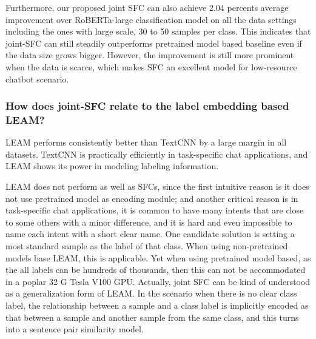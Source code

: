 Furthermore, our proposed joint SFC can also achieve 2.04 percents average
improvement over RoBERTa-large classification model on all the data settings
including the ones with large scale, 30 to 50 samples per class. This
indicates that joint-SFC can still steadily outperforms pretrained model based
baseline even if the data size grows bigger. However, the improvement is still
more prominent when the data is scarce, which makes SFC an excellent model for
low-resource chatbot scenario.

\subsubsection*{How does joint-SFC relate to the label embedding based LEAM?}
LEAM performs consistently better than TextCNN by a large margin in all
datasets. TextCNN is practically efficiently in task-specific chat
applications, and LEAM shows its power in modeling labeling information.

LEAM does not perform as well as SFCs, since the first intuitive reason is it
does not use pretrained model as encoding module; and another critical reason
is in task-specific chat applications, it is common to have many intents
that are close to some others with a minor difference, and it is hard and even
impossible to name each intent with a short clear name. One candidate
solution is setting a most standard sample as the label of that class. When
using non-pretrained models base LEAM, this is applicable. Yet when using
pretrained model based, as the all labels can be hundreds of thousands, then
this can not be accommodated in a poplar 32 G Tesla V100 GPU. Actually, joint
SFC can be kind of understood as a generalization form of LEAM. In the
scenario when there is no clear class label, the relationship between a sample
and a class label is implicitly encoded as that between a sample and another
sample from the same class, and this turns into a sentence pair similarity
model.


